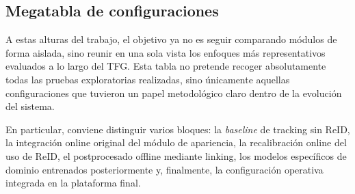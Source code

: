 \documentclass[../MAIN.tex]{subfiles}
\begin{document}
	\subsection{Megatabla de configuraciones}
	
	A estas alturas del trabajo, el objetivo ya no es seguir comparando módulos de forma aislada, sino reunir en una sola vista los enfoques más representativos evaluados a lo largo del TFG. Esta tabla no pretende recoger absolutamente todas las pruebas exploratorias realizadas, sino únicamente aquellas configuraciones que tuvieron un papel metodológico claro dentro de la evolución del sistema.
	
	En particular, conviene distinguir varios bloques: la \textit{baseline} de tracking sin ReID, la integración online original del módulo de apariencia, la recalibración online del uso de ReID, el postprocesado offline mediante linking, los modelos específicos de dominio entrenados posteriormente y, finalmente, la configuración operativa integrada en la plataforma final.
	
\end{document}
